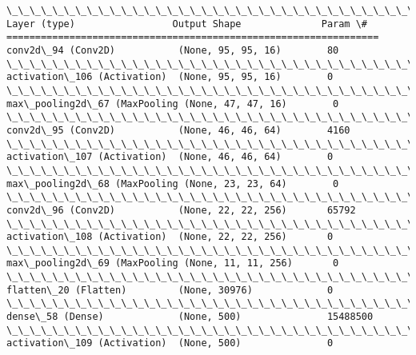 \documentclass[11pt]{article}
\begin{document}
    \begin{Verbatim}[commandchars=\\\{\}]
\_\_\_\_\_\_\_\_\_\_\_\_\_\_\_\_\_\_\_\_\_\_\_\_\_\_\_\_\_\_\_\_\_\_\_\_\_\_\_\_\_\_\_\_\_\_\_\_\_\_\_\_\_\_\_\_\_\_\_\_\_\_\_\_\_
Layer (type)                 Output Shape              Param \#   
=================================================================
conv2d\_94 (Conv2D)           (None, 95, 95, 16)        80        
\_\_\_\_\_\_\_\_\_\_\_\_\_\_\_\_\_\_\_\_\_\_\_\_\_\_\_\_\_\_\_\_\_\_\_\_\_\_\_\_\_\_\_\_\_\_\_\_\_\_\_\_\_\_\_\_\_\_\_\_\_\_\_\_\_
activation\_106 (Activation)  (None, 95, 95, 16)        0         
\_\_\_\_\_\_\_\_\_\_\_\_\_\_\_\_\_\_\_\_\_\_\_\_\_\_\_\_\_\_\_\_\_\_\_\_\_\_\_\_\_\_\_\_\_\_\_\_\_\_\_\_\_\_\_\_\_\_\_\_\_\_\_\_\_
max\_pooling2d\_67 (MaxPooling (None, 47, 47, 16)        0         
\_\_\_\_\_\_\_\_\_\_\_\_\_\_\_\_\_\_\_\_\_\_\_\_\_\_\_\_\_\_\_\_\_\_\_\_\_\_\_\_\_\_\_\_\_\_\_\_\_\_\_\_\_\_\_\_\_\_\_\_\_\_\_\_\_
conv2d\_95 (Conv2D)           (None, 46, 46, 64)        4160      
\_\_\_\_\_\_\_\_\_\_\_\_\_\_\_\_\_\_\_\_\_\_\_\_\_\_\_\_\_\_\_\_\_\_\_\_\_\_\_\_\_\_\_\_\_\_\_\_\_\_\_\_\_\_\_\_\_\_\_\_\_\_\_\_\_
activation\_107 (Activation)  (None, 46, 46, 64)        0         
\_\_\_\_\_\_\_\_\_\_\_\_\_\_\_\_\_\_\_\_\_\_\_\_\_\_\_\_\_\_\_\_\_\_\_\_\_\_\_\_\_\_\_\_\_\_\_\_\_\_\_\_\_\_\_\_\_\_\_\_\_\_\_\_\_
max\_pooling2d\_68 (MaxPooling (None, 23, 23, 64)        0         
\_\_\_\_\_\_\_\_\_\_\_\_\_\_\_\_\_\_\_\_\_\_\_\_\_\_\_\_\_\_\_\_\_\_\_\_\_\_\_\_\_\_\_\_\_\_\_\_\_\_\_\_\_\_\_\_\_\_\_\_\_\_\_\_\_
conv2d\_96 (Conv2D)           (None, 22, 22, 256)       65792     
\_\_\_\_\_\_\_\_\_\_\_\_\_\_\_\_\_\_\_\_\_\_\_\_\_\_\_\_\_\_\_\_\_\_\_\_\_\_\_\_\_\_\_\_\_\_\_\_\_\_\_\_\_\_\_\_\_\_\_\_\_\_\_\_\_
activation\_108 (Activation)  (None, 22, 22, 256)       0         
\_\_\_\_\_\_\_\_\_\_\_\_\_\_\_\_\_\_\_\_\_\_\_\_\_\_\_\_\_\_\_\_\_\_\_\_\_\_\_\_\_\_\_\_\_\_\_\_\_\_\_\_\_\_\_\_\_\_\_\_\_\_\_\_\_
max\_pooling2d\_69 (MaxPooling (None, 11, 11, 256)       0         
\_\_\_\_\_\_\_\_\_\_\_\_\_\_\_\_\_\_\_\_\_\_\_\_\_\_\_\_\_\_\_\_\_\_\_\_\_\_\_\_\_\_\_\_\_\_\_\_\_\_\_\_\_\_\_\_\_\_\_\_\_\_\_\_\_
flatten\_20 (Flatten)         (None, 30976)             0         
\_\_\_\_\_\_\_\_\_\_\_\_\_\_\_\_\_\_\_\_\_\_\_\_\_\_\_\_\_\_\_\_\_\_\_\_\_\_\_\_\_\_\_\_\_\_\_\_\_\_\_\_\_\_\_\_\_\_\_\_\_\_\_\_\_
dense\_58 (Dense)             (None, 500)               15488500  
\_\_\_\_\_\_\_\_\_\_\_\_\_\_\_\_\_\_\_\_\_\_\_\_\_\_\_\_\_\_\_\_\_\_\_\_\_\_\_\_\_\_\_\_\_\_\_\_\_\_\_\_\_\_\_\_\_\_\_\_\_\_\_\_\_
activation\_109 (Activation)  (None, 500)               0         

\end{Verbatim}
\end{document}
